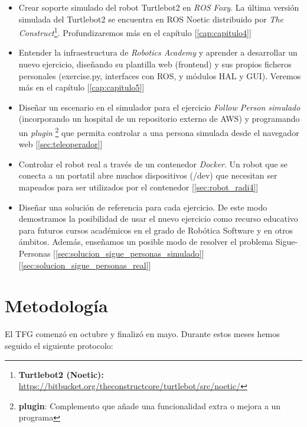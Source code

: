 \begin{itemize}
	\item Crear soporte simulado del robot Turtlebot2 en \textit{ROS Foxy}. La última versión simulada del Turtlebot2 se encuentra en ROS Noetic distribuido por \textit{The Construct}\footnote{\textbf{Turtlebot2 (Noetic):} \url{https://bitbucket.org/theconstructcore/turtlebot/src/noetic/}}. Profundizaremos más en el capítulo [\ref{cap:capitulo4}]
	\item Entender la infraestructura de \textit{Robotics Academy} y aprender a desarrollar un nuevo ejercicio, diseñando su plantilla web (frontend) y sus propios ficheros personales (exercise.py, interfaces con ROS, y módulos HAL y GUI). Veremos más en el capítulo [\ref{cap:capitulo5}]
	\item Diseñar un escenario en el simulador para el ejercicio \textit{Follow Person simulado} (incorporando un hospital de un repositorio externo de AWS) y programando un \textit{plugin} \footnote{\textbf{plugin}: Complemento que añade una funcionalidad extra o mejora a un programa} que permita controlar a una persona simulada desde el navegador web [\ref{sec:teleoperador}]
	\item Controlar el robot real a través de un contenedor \textit{Docker}. Un robot que se conecta a un portatil abre muchos dispositivos (/dev) que necesitan ser mapeados para ser utilizados por el contenedor [\ref{sec:robot_radi4}]
	\item Diseñar una solución de referencia para cada ejercicio. De este modo demostramos la posibilidad de usar el nuevo ejercicio como recurso educativo para futuros cursos académicos en el grado de Robótica Software y en otros ámbitos. Además, enseñamos un posible modo de resolver el problema Sigue-Personas [\ref{sec:solucion_sigue_personas_simulado}] [\ref{sec:solucion_sigue_personas_real}]
\end{itemize}



\section{Metodología}
\label{sec:metodologia}
El TFG comenzó en octubre y finalizó en mayo. Durante estos meses hemos seguido el siguiente protocolo:

